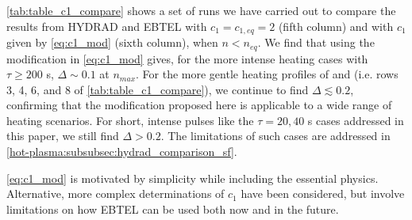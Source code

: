 \autoref{tab:table_c1_compare} shows a set of runs we have carried out to compare the results from HYDRAD and EBTEL with $c_1=c_{1,eq}=2$ (fifth column) and with $c_1$ given by \autoref{eq:c1_mod} (sixth column), when $n<n_{eq}$. We find that using the modification in \autoref{eq:c1_mod} gives, for the more intense heating cases with $\tau\ge200$ s, $\Delta\sim0.1$ at $n_{max}$. For the more gentle heating profiles of \citet{cargill_enthalpy-based_2012} and \citet{bradshaw_influence_2013} (i.e. rows 3, 4, 6, and 8 of \autoref{tab:table_c1_compare}), we continue to find $\Delta\lesssim0.2$, confirming that the modification proposed here is applicable to a wide range of heating scenarios. For short, intense pulses like the $\tau=20,40$ s cases addressed in this paper, we still find $\Delta>0.2$. The limitations of such cases are addressed in \autoref{hot-plasma:subsubsec:hydrad_comparison_sf}.


\autoref{eq:c1_mod} is motivated by simplicity while including the essential physics. Alternative, more complex determinations of $c_1$ have been considered, but involve limitations on how EBTEL can be used both now and in the future.